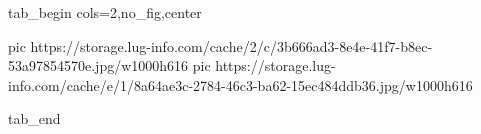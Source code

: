  
 
 
 
 


\ifcmt
  tab_begin cols=2,no_fig,center

     pic https://storage.lug-info.com/cache/2/c/3b666ad3-8e4e-41f7-b8ec-53a97854570e.jpg/w1000h616
		 pic https://storage.lug-info.com/cache/e/1/8a64ae3c-2784-46c3-ba62-15ec484ddb36.jpg/w1000h616

  tab_end
\fi
